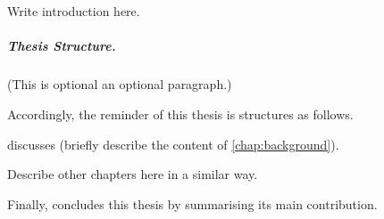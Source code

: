 \chapter{\introductionname}
\label{chap:introduction}

Write introduction here.

\paragraph{Thesis Structure.}

(This is optional an optional paragraph.)

Accordingly, the reminder of this thesis is structures as follows.

 discusses (briefly describe the content of \cref{chap:background}).

Describe other chapters here in a similar way.

Finally,  concludes this thesis by summarising its main contribution.
